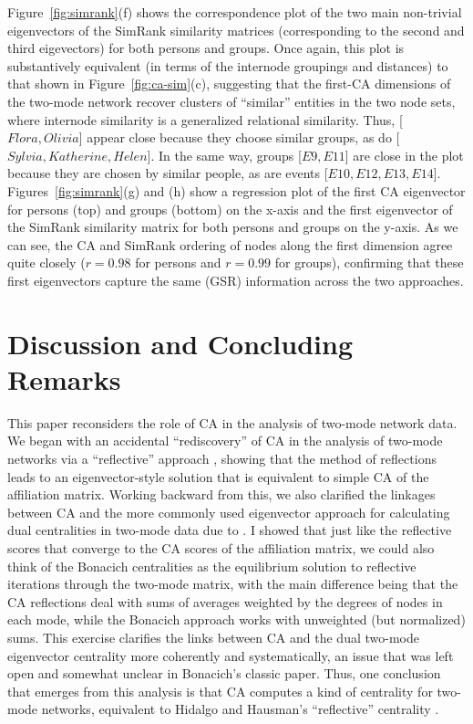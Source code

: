 \documentclass[a4paper,fleqn]{cas-sc}
\begin{document}
Figure~\ref{fig:simrank}(f) shows the correspondence plot of the two main non-trivial eigenvectors of the SimRank similarity matrices (corresponding to the second and third eigevectors) for both persons and groups. Once again, this plot is substantively equivalent (in terms of the internode groupings and distances) to that shown in Figure~\ref{fig:ca-sim}(c), suggesting that the first-CA dimensions of the two-mode network recover clusters of ``similar'' entities in the two node sets, where internode similarity is a generalized relational similarity. Thus, [$Flora, Olivia$] appear close because they choose similar groups, as do [$Sylvia, Katherine, Helen$]. In the same way, groups [$E9, E11$] are close in the plot because they are chosen by similar people, as are events [$E10, E12, E13, E14$]. Figures~\ref{fig:simrank}(g) and (h) show a regression plot of the first CA eigenvector for persons (top) and groups (bottom) on the x-axis and the first eigenvector of the SimRank similarity matrix for both persons and groups on the y-axis. As we can see, the CA and SimRank ordering of nodes along the first dimension agree quite closely ($r = 0.98$ for persons and $r = 0.99$ for groups), confirming that these first eigenvectors capture the same (GSR) information across the two approaches. 

\section{Discussion and Concluding Remarks} \label{sec:disc}
This paper reconsiders the role of CA in the analysis of two-mode network data. We began with an accidental ``rediscovery'' of CA in the analysis of two-mode networks via a ``reflective'' approach \citep{hidalgo2009building}, showing that the method of reflections leads to an eigenvector-style solution that is equivalent to simple CA of the affiliation matrix. Working backward from this, we also clarified the linkages between CA and the more commonly used eigenvector approach for calculating dual centralities in two-mode data due to \citet{bonacich1991simultaneous}. I showed that just like the reflective scores that converge to the CA scores of the affiliation matrix, we could also think of the Bonacich centralities as the equilibrium solution to reflective iterations through the two-mode matrix, with the main difference being that the CA reflections deal with sums of averages weighted by the degrees of nodes in each mode, while the Bonacich approach works with unweighted (but normalized) sums. This exercise clarifies the links between CA and the dual two-mode eigenvector centrality more coherently and systematically, an issue that was left open and somewhat unclear in Bonacich's \citeyearpar{bonacich1991simultaneous} classic paper. Thus, one conclusion that emerges from this analysis is that CA computes a kind of centrality for two-mode networks, equivalent to Hidalgo and Hausman's ``reflective'' centrality \citep{van2021correspondence}.
\end{document}
